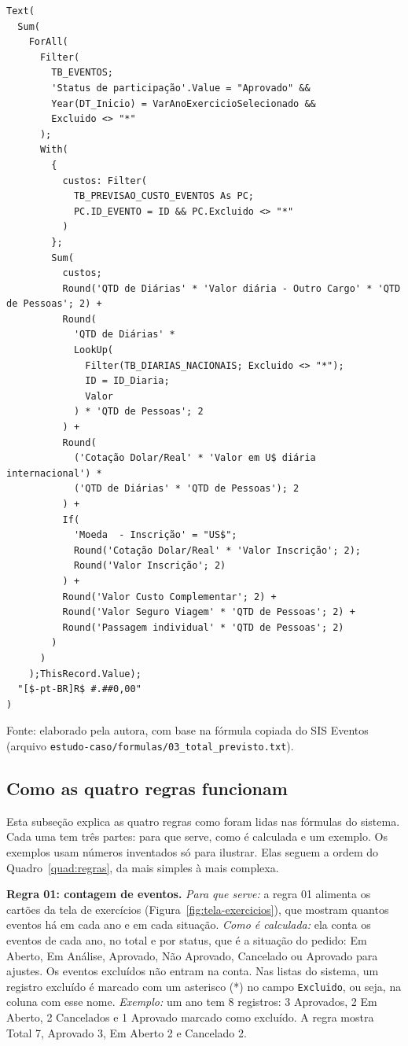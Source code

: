 \noindent\begin{minipage}{\textwidth}
\begin{lstlisting}[caption={Fórmula do total previsto de custos dos eventos aprovados de um ano (regra 03)}, label={cod:formula-regra03}, language={}, basicstyle={\fontsize{9}{11}\selectfont\ttfamily}, breaklines=true, upquote=true]
Text(
  Sum(
    ForAll(
      Filter(
        TB_EVENTOS;
        'Status de participação'.Value = "Aprovado" &&
        Year(DT_Inicio) = VarAnoExercicioSelecionado &&
        Excluido <> "*"
      );
      With(
        {
          custos: Filter(
            TB_PREVISAO_CUSTO_EVENTOS As PC;
            PC.ID_EVENTO = ID && PC.Excluido <> "*"
          )
        };
        Sum(
          custos;
          Round('QTD de Diárias' * 'Valor diária - Outro Cargo' * 'QTD de Pessoas'; 2) +
          Round(
            'QTD de Diárias' *
            LookUp(
              Filter(TB_DIARIAS_NACIONAIS; Excluido <> "*");
              ID = ID_Diaria;
              Valor
            ) * 'QTD de Pessoas'; 2
          ) +
          Round(
            ('Cotação Dolar/Real' * 'Valor em U$ diária internacional') *
            ('QTD de Diárias' * 'QTD de Pessoas'); 2
          ) +
          If(
            'Moeda  - Inscrição' = "US$";
            Round('Cotação Dolar/Real' * 'Valor Inscrição'; 2);
            Round('Valor Inscrição'; 2)
          ) +
          Round('Valor Custo Complementar'; 2) +
          Round('Valor Seguro Viagem' * 'QTD de Pessoas'; 2) +
          Round('Passagem individual' * 'QTD de Pessoas'; 2)
        )
      )
    );ThisRecord.Value);
  "[$-pt-BR]R$ #.##0,00"
)
\end{lstlisting}
\centering\footnotesize Fonte: elaborado pela autora, com base na fórmula copiada do SIS Eventos (arquivo \texttt{estudo-caso/formulas/03\_total\_previsto.txt}).
\end{minipage}

\subsection{Como as quatro regras funcionam}
\label{sec:como-regras}

Esta subseção explica as quatro regras como foram lidas nas fórmulas do sistema. Cada uma tem três partes: para que serve, como é calculada e um exemplo. Os exemplos usam números inventados só para ilustrar. Elas seguem a ordem do Quadro~\ref{quad:regras}, da mais simples à mais complexa.

\textbf{Regra 01: contagem de eventos.} \textit{Para que serve:} a regra 01 alimenta os cartões da tela de exercícios (Figura~\ref{fig:tela-exercicios}), que mostram quantos eventos há em cada ano e em cada situação. \textit{Como é calculada:} ela conta os eventos de cada ano, no total e por status, que é a situação do pedido: Em Aberto, Em Análise, Aprovado, Não Aprovado, Cancelado ou Aprovado para ajustes. Os eventos excluídos não entram na conta. Nas listas do sistema, um registro excluído é marcado com um asterisco (*) no campo \texttt{Excluido}, ou seja, na coluna com esse nome. \textit{Exemplo:} um ano tem 8 registros: 3 Aprovados, 2 Em Aberto, 2 Cancelados e 1 Aprovado marcado como excluído. A regra mostra Total 7, Aprovado 3, Em Aberto 2 e Cancelado 2.

